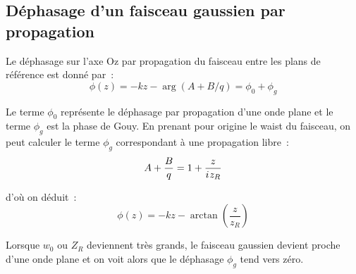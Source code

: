 \documentclass[a4paper]{book}
\newcommand{\iu}{{i\mkern1mu}}
\begin{document}
\subsection{Déphasage d'un faisceau gaussien par propagation}

Le déphasage sur l'axe Oz par propagation du faisceau entre les plans de référence est donné par~:
\begin{equation}
    \phi(z) = -kz-\arg(A+B/q) = \phi_0+\phi_g
\end{equation}

Le terme $\phi_0$ représente le déphasage par propagation d'une onde plane et le terme $\phi_g$ est la phase de Gouy. En prenant pour origine le waist du faisceau, on peut calculer le terme $\phi_g$ correspondant à une propagation libre~:
\begin{equation}
    A+\frac{B}{q}=1+\frac{z}{\iu z_R}
\end{equation}

d'où on déduit~:
\begin{equation}
    \phi(z) = -kz-\arctan\left(\frac{z}{z_R}\right)
\end{equation}

Lorsque $w_0$ ou $Z_R$ deviennent très grands, le faisceau gaussien devient proche d'une onde plane et on voit alors que le déphasage $\phi_g$ tend vers zéro.



\medskip

\noindent{}\hfill
    
\end{document}
